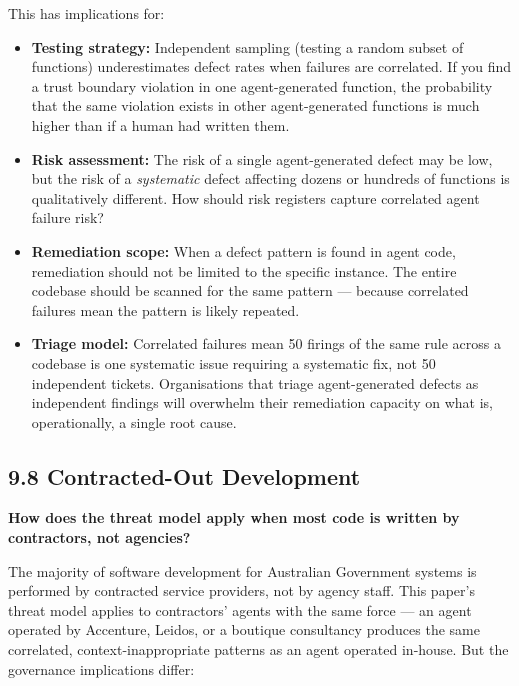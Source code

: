 \documentclass[a4paper,11pt]{report}
\providecommand{\tightlist}{%
  \setlength{\itemsep}{0pt}\setlength{\parskip}{0pt}}
\begin{document}
This has implications for:

\begin{itemize}
\tightlist
\item
  \textbf{Testing strategy:} Independent sampling (testing a random
  subset of functions) underestimates defect rates when failures are
  correlated. If you find a trust boundary violation in one
  agent-generated function, the probability that the same violation
  exists in other agent-generated functions is much higher than if a
  human had written them.
\item
  \textbf{Risk assessment:} The risk of a single agent-generated defect
  may be low, but the risk of a \emph{systematic} defect affecting
  dozens or hundreds of functions is qualitatively different. How should
  risk registers capture correlated agent failure risk?
\item
  \textbf{Remediation scope:} When a defect pattern is found in agent
  code, remediation should not be limited to the specific instance. The
  entire codebase should be scanned for the same pattern --- because
  correlated failures mean the pattern is likely repeated.
\item
  \textbf{Triage model:} Correlated failures mean 50 firings of the same
  rule across a codebase is one systematic issue requiring a systematic
  fix, not 50 independent tickets. Organisations that triage
  agent-generated defects as independent findings will overwhelm their
  remediation capacity on what is, operationally, a single root cause.
\end{itemize}

\hypertarget{contracted-out-development}{%
\subsection{9.8 Contracted-Out
Development}\label{contracted-out-development}}

\textbf{How does the threat model apply when most code is written by
contractors, not agencies?}

The majority of software development for Australian Government systems
is performed by contracted service providers, not by agency staff. This
paper's threat model applies to contractors' agents with the same force
--- an agent operated by Accenture, Leidos, or a boutique consultancy
produces the same correlated, context-inappropriate patterns as an agent
operated in-house. But the governance implications differ:
\end{document}
